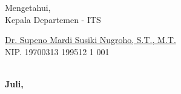 
\begin{center}
  Mengetahui, \\
  Kepala Departemen \department{} \facultyshort{} - ITS\\

  \vspace{15ex}

  \underline{Dr. Supeno Mardi Susiki Nugroho, S.T., M.T.} \\
  NIP. 19700313 199512 1 001
\end{center}

\begin{center}
  \textbf{\MakeUppercase{\place{}}\\Juli, \the\year{}}
\end{center}
\endgroup
